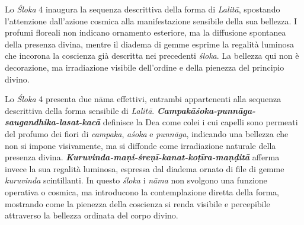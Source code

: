 Lo \textit{Śloka} 4 inaugura la sequenza descrittiva della forma di \textit{Lalitā}, spostando l’attenzione dall’azione cosmica alla manifestazione sensibile della sua bellezza. I profumi floreali non indicano ornamento esteriore, ma la diffusione spontanea della presenza divina, mentre il diadema di gemme esprime la regalità luminosa che incorona la coscienza già descritta nei precedenti \textit{śloka}. La bellezza qui non è decorazione, ma irradiazione visibile dell’ordine e della pienezza del principio divino.

Lo \textit{Śloka} 4 presenta due nāma effettivi, entrambi appartenenti alla sequenza descrittiva della forma sensibile di \textit{Lalitā}. \textbf{\textit{Campakāśoka-punnāga-saugandhika-lasat-kacā}} definisce la Dea come colei i cui capelli sono permeati del profumo dei fiori di \textit{campaka}, \textit{aśoka} e \textit{punnāga}, indicando una bellezza che non si impone visivamente, ma si diffonde come irradiazione naturale della presenza divina. \textbf{\textit{Kuruvinda-maṇi-śreṇī-kanat-koṭīra-maṇḍitā}} afferma invece la sua regalità luminosa, espressa dal diadema ornato di file di gemme \textit{kuruvinda} scintillanti. In questo \textit{śloka} i \textit{nāma} non svolgono una funzione operativa o cosmica, ma introducono la contemplazione diretta della forma, mostrando come la pienezza della coscienza si renda visibile e percepibile attraverso la bellezza ordinata del corpo divino.
